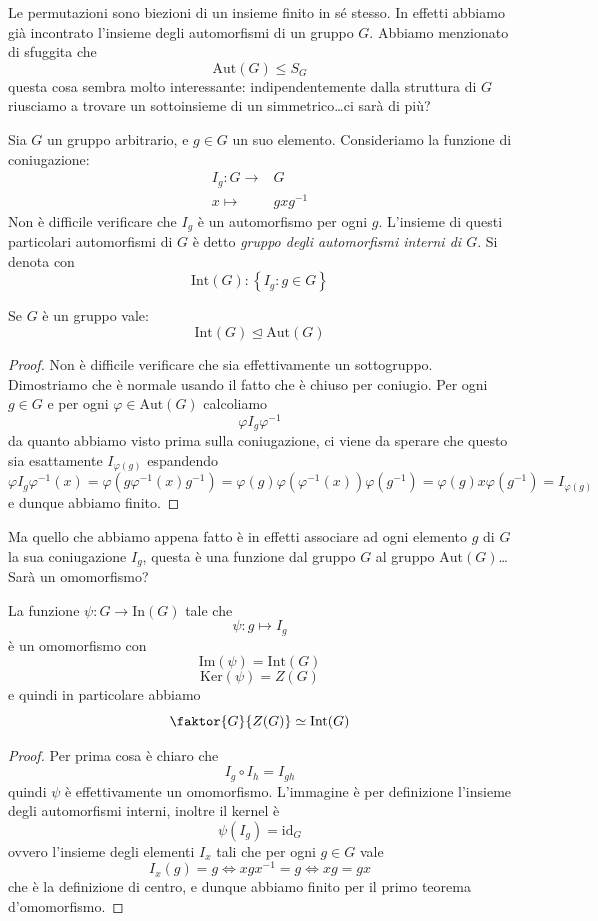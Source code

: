 \documentclass[11pt]{scrartcl}
\newcommand{\Immagine}[1]{\text{Im}\!\left(#1\right)}
\renewcommand{\ker}[1]{\text{Ker}\!\left(#1\right)}
\newcommand{\normal}{\mathrel{\unlhd}}
\begin{document}
	Le permutazioni sono biezioni di un insieme finito in sé stesso. In effetti abbiamo già incontrato l'insieme degli automorfismi di un gruppo $G$. Abbiamo menzionato di sfuggita che
	$$\text{Aut}(G)\le S_G$$
	questa cosa sembra molto interessante: indipendentemente dalla struttura di $G$ riusciamo a trovare un sottoinsieme di un simmetrico\dots ci sarà di più?
	\begin{definition}
		Sia $G$ un gruppo arbitrario, e $g\in G$ un suo elemento. Consideriamo la funzione di coniugazione:
		\begin{align*}
			I_g:G\to &G \\
			x\mapsto & gxg^{-1}
		\end{align*}
		Non è difficile verificare che $I_g$ è un automorfismo per ogni $g$. L'insieme di questi particolari automorfismi di $G$ è detto \textit{gruppo degli automorfismi interni di $G$}. Si denota con
		$$\text{Int}(G):\left\{I_g:g\in G\right\}$$
	\end{definition}
	\begin{proposition}
		Se $G$ è un gruppo vale: 
		$$\text{Int}(G)\normal\text{Aut}(G)$$
	\end{proposition}
	\begin{proof}
		Non è difficile verificare che sia effettivamente un sottogruppo. Dimostriamo che è normale usando il fatto che è chiuso per coniugio. Per ogni $g\in G$ e per ogni $\varphi\in \text{Aut}(G)$ calcoliamo 
		$$\varphi I_g \varphi^{-1}$$
		da quanto abbiamo visto prima sulla coniugazione, ci viene da sperare che questo sia esattamente $I_{\varphi(g)}$
		espandendo
		$$\varphi I_g \varphi^{-1}(x)=\varphi\left(g\varphi^{-1}(x)g^{-1}\right)=\varphi(g)\varphi(\varphi^{-1}(x))\varphi(g^{-1})=\varphi(g)x\varphi(g^{-1})=I_{\varphi(g)}$$
		e dunque abbiamo finito.
	\end{proof}
	Ma quello che abbiamo appena fatto è in effetti associare ad ogni elemento $g$ di $G$ la sua coniugazione $I_g$, questa è una funzione dal gruppo $G$ al gruppo $\text{Aut}(G)$\dots Sarà un omomorfismo?
	\begin{lemma}
		La funzione $\psi:G\to \text{In}(G)$ tale che 
		$$\psi:g\mapsto I_g$$
		è un omomorfismo con
		$$\Immagine{\psi}=\text{Int}(G)$$
		$$\ker{\psi} = Z(G)$$
		e quindi in particolare abbiamo
		$$\faktor{G}{Z(G)}\simeq \text{Int}(G)$$
	\end{lemma}
	\begin{proof}
		Per prima cosa è chiaro che 
		$$I_g\circ I_h=I_{gh}$$
		quindi $\psi$ è effettivamente un omomorfismo. L'immagine è per definizione l'insieme degli automorfismi interni, inoltre il kernel è 
		$$\psi(I_g)=\text{id}_G$$
		ovvero l'insieme degli elementi $I_x$ tali che per ogni $g\in G$ vale
		$$I_x(g)=g \iff xgx^{-1}=g \iff xg=gx$$
		che è la definizione di centro, e dunque abbiamo finito per il primo teorema d'omomorfismo.
	\end{proof}
\end{document}
